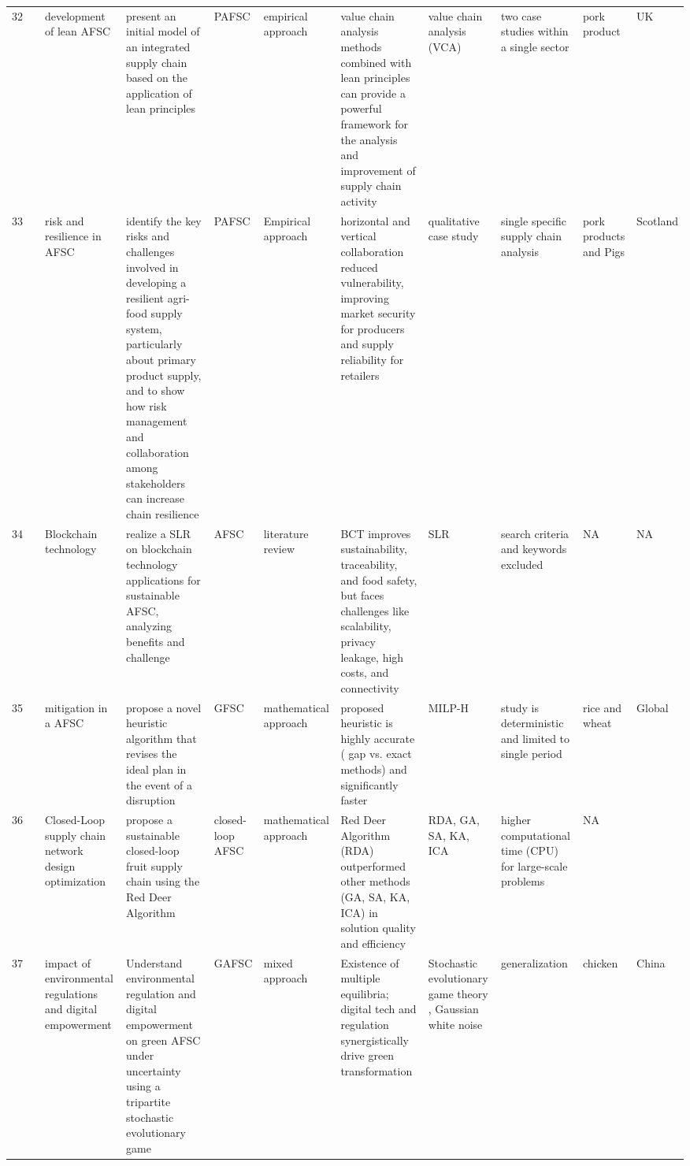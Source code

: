 \documentclass[a4paper,10pt]{article}
\begin{document}
\begin{landscape}
\begin{small}
\begin{longtable}{p{0.5cm} p{2cm} p{2.5cm} p{4cm} p{1cm} p{2.5cm} p{5.5cm} p{2.5cm} p{2.5cm} p{1.8cm} p{1.5cm}}
32 & \textcite{Taylor3} & development of lean AFSC & present an initial model of an integrated supply chain based on the application of lean principles&PAFSC& empirical approach& value chain analysis methods combined with lean principles can provide a powerful framework for the analysis and improvement of supply chain activity &value chain analysis (VCA)   & two case studies within a single sector& pork product& UK\\
33 & \textcite{Leat6} &   risk and resilience in AFSC& identify the key risks and challenges involved in developing a resilient agri-food supply system, particularly about primary product supply, and to show how risk management and collaboration among stakeholders can increase chain resilience&PAFSC & Empirical approach&horizontal and vertical collaboration reduced vulnerability, improving market security for producers and supply reliability for retailers &qualitative case study& single specific supply chain analysis& pork products and Pigs& Scotland   \\
34 & \textcite{Rana5} &  Blockchain technology & realize a SLR on blockchain technology  applications for sustainable AFSC, analyzing benefits and challenge&AFSC & literature review& BCT improves sustainability, traceability, and food safety, but faces challenges like scalability, privacy leakage, high costs, and connectivity &SLR   &  search criteria and keywords excluded & NA& NA    \\
35 & \textcite{Sasi8} &   mitigation in a AFSC& propose a novel heuristic algorithm that revises the ideal plan in the event of a disruption &GFSC & mathematical approach&  proposed heuristic is highly accurate ( gap vs. exact methods) and significantly faster &MILP-H   & study is deterministic and limited to single period& rice and wheat& Global   \\
36 & \textcite{Karki10} &  Closed-Loop supply chain network design optimization  & propose  a sustainable closed-loop fruit supply chain using the Red Deer Algorithm&closed-loop AFSC & mathematical approach&  Red Deer Algorithm (RDA) outperformed other methods (GA, SA, KA, ICA) in solution quality and efficiency &RDA, GA, SA, KA, ICA  &higher computational time (CPU) for large-scale problems&NA \\ 
37 & \textcite{Zheng27} &  impact of environmental regulations and digital empowerment & Understand environmental regulation and digital empowerment on green AFSC under uncertainty using a tripartite stochastic evolutionary game&GAFSC & mixed approach& Existence of multiple equilibria; digital tech and regulation synergistically drive green transformation &Stochastic evolutionary game theory , Gaussian white noise  & generalization& chicken& China  \\

\end{longtable}
\end{small}
\end{landscape}
\end{document}
